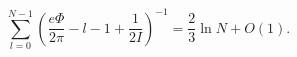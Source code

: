 \begin{equation}
\label{Eq_A37}
\sum^{N-1}_{l=0}
  \left( \frac{e\Phi}{2\pi} - l - 1 + \frac{1}{2I} \right)^{-1}
  = \frac{2}{3} \ln N + O(1).
\end{equation}

